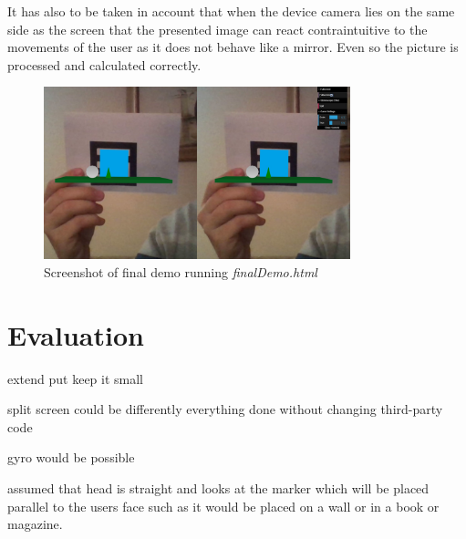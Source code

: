 It has also to be taken in account that when the device camera lies on the same side as the screen that the presented image can react contraintuitive to the movements of the user as it does not behave like a mirror. Even so the picture is processed and calculated correctly. 

\begin{figure}[h]
    \centering
    \includegraphics[height=5cm]{Document/Figures/chapter4/ScreenshotFinalDemo.jpg}
    \caption[Screenshot final demo]{Screenshot of final demo running \mbox{\textit{finalDemo.html}}}
    \label{fig:finalDemo}
\end{figure}


\section{Evaluation}
extend put keep it small

split screen could be differently
everything done without changing third-party code

gyro would be possible


assumed that head is straight and looks at the marker which will be placed parallel to the users face such as it would be placed on a wall or in a book or magazine. 